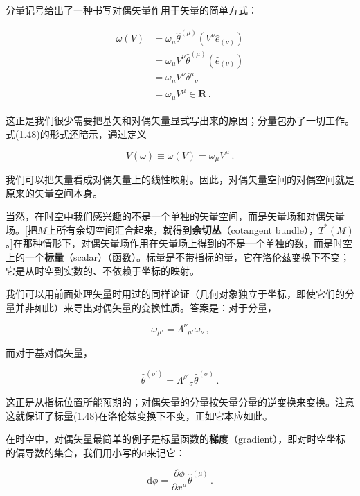 分量记号给出了一种书写对偶矢量作用于矢量的简单方式：

\begin{align*}
\omega(V)&=\omega_{\mu}\hat{\theta}^{(\mu)}(V^{\nu}\hat{e}_{(\nu)})\\
&=\omega_{\mu}V^{\nu}\hat{\theta}^{(\mu)}(\hat{e}_{(\nu)})\\
&=\omega_{\mu}V^{\nu}\delta^{\mu}{}_{\nu}\\
&=\omega_{\mu}V^{\mu}\in\mathbf{R}\,.
\tag{1.48}
\end{align*}

这正是我们很少需要把基矢和对偶矢量显式写出来的原因；分量包办了一切工作。式(1.48)的形式还暗示，通过定义

\begin{equation*}
V(\omega)\equiv\omega(V)=\omega_{\mu}V^{\mu}\,.
\tag{1.49}
\end{equation*}

我们可以把矢量看成对偶矢量上的线性映射。因此，对偶矢量空间的对偶空间就是原来的矢量空间本身。

当然，在时空中我们感兴趣的不是一个单独的矢量空间，而是矢量场和对偶矢量场。[把$M$上所有余切空间汇合起来，就得到\textbf{余切丛}（cotangent bundle），$T^{*}(M)$。]在那种情形下，对偶矢量场作用在矢量场上得到的不是一个单独的数，而是时空上的一个\textbf{标量}（scalar）（函数）。标量是不带指标的量，它在洛伦兹变换下不变；它是从时空到实数的、不依赖于坐标的映射。

我们可以用前面处理矢量时用过的同样论证（几何对象独立于坐标，即使它们的分量并非如此）来导出对偶矢量的变换性质。答案是：对于分量，

\begin{equation*}
\boxed{\,\omega_{\mu'}=\Lambda^{\nu}{}_{\mu'}\omega_{\nu}\,,}
\tag{1.50}
\end{equation*}

而对于基对偶矢量，

\begin{equation*}
\hat{\theta}^{(\rho')}=\Lambda^{\rho'}{}_{\sigma}\hat{\theta}^{(\sigma)}\,.
\tag{1.51}
\end{equation*}

这正是从指标位置所能预期的；对偶矢量的分量按矢量分量的逆变换来变换。注意这就保证了标量(1.48)在洛伦兹变换下不变，正如它本应如此。

在时空中，对偶矢量最简单的例子是标量函数的\textbf{梯度}（gradient），即对时空坐标的偏导数的集合，我们用小写的d来记它：

\begin{equation*}
\mathrm{d}\phi=\frac{\partial\phi}{\partial x^{\mu}}\hat{\theta}^{(\mu)}\,.
\tag{1.52}
\end{equation*}

